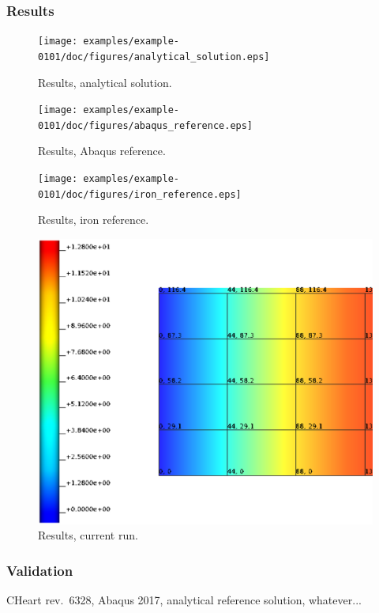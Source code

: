 \subsubsection{Results}
%
\begin{figure}[h!]
    \centering 
    \texttt{[image: examples/example-0101/doc/figures/analytical\_solution.eps]} 
    \caption{Results, analytical solution.}
    \label{example-0101-analytical-solution-fig}
\end{figure}
%
\begin{figure}[h!]
    \centering 
    \texttt{[image: examples/example-0101/doc/figures/abaqus\_reference.eps]} 
    \caption{Results, Abaqus reference.}
    \label{example-0101-abaqus-reference-fig}
\end{figure}
%
\begin{figure}[h!]
    \centering 
    \texttt{[image: examples/example-0101/doc/figures/iron\_reference.eps]} 
    \caption{Results, iron reference.}
    \label{example-0101-iron-reference-fig}
\end{figure}
%
\begin{figure}[h!]
    \centering 
    \includegraphics[width=\columnwidth]{examples/example-0101/doc/figures/current_run.eps} 
    \caption{Results, current run.}
    \label{example-0101-current-run-fig}
\end{figure}
%
%
\subsubsection{Validation}
%
CHeart rev.\ 6328, Abaqus 2017, analytical reference solution, whatever...
%
